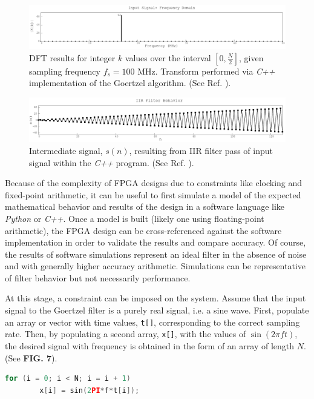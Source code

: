 \documentclass[reprint,amsmath,amssymb]{revtex4-2}
\begin{document}
\begin{figure}
    \centering
    \includegraphics[width=1.01\linewidth]{figs/signal_DFT.png}
        \caption{DFT results for integer $k$ values over the interval $[0,\frac{N}{2}]$, given sampling frequency $f_s = 100$ MHz. Transform performed via \textit{C++} implementation of the Goertzel algorithm. (See Ref. \cite{github}).}
    \label{fig:8}
\end{figure}

\begin{figure}
    \centering
    \includegraphics[width=\linewidth]{figs/probe.png}
    \caption{Intermediate signal, $s(n)$, resulting from IIR filter pass of input signal within the \textit{C++} program. (See Ref. \cite{github}).}
    \label{fig:9}
\end{figure}

Because of the complexity of FPGA designs due to constraints like clocking and fixed-point arithmetic, it can be useful to first simulate a model of the expected mathematical behavior and results of the design in a software language like \textit{Python} or \textit{C++}. Once a model is built (likely one using floating-point arithmetic), the FPGA design can be cross-referenced against the software implementation in order to validate the results and compare accuracy. Of course, the results of software simulations represent an ideal filter in the absence of noise and with generally higher accuracy arithmetic. Simulations can be representative of filter behavior but not necessarily performance.

\bigskip

At this stage, a constraint can be imposed on the system. Assume that the input signal to the Goertzel filter is a purely real signal, i.e. a sine wave. First, populate an array or vector with time values, \verb+t[]+, corresponding to the correct sampling rate. Then, by populating a second array, \verb+x[]+, with the values of $\sin(2\pi f t)$, the desired signal with frequency is obtained in the form of an array of length $N$. (See \textbf{FIG. 7}).
\begin{lstlisting}[language=C++]
    for (i = 0; i < N; i = i + 1)
        x[i] = sin(2PI*f*t[i]);
\end{lstlisting}
\end{document}
